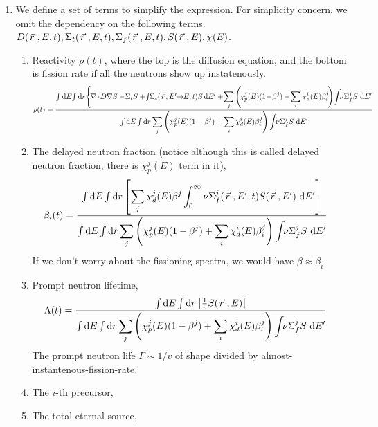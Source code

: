 \documentclass{school-22.211-notes}
\begin{document}
\begin{enumerate}
\item We define a set of terms to simplify the expression. For simplicity concern, we omit the dependency on the following terms. $D(\left.\vec{r}\right., E, t), \Sigma_t (\left.\vec{r}\right., E, t), \Sigma_f(\left.\vec{r}\right., E, t),  S(\left.\vec{r}\right., E), \chi(E)$. 
\begin{enumerate}
\item Reactivity $\rho(t)$, where the top is the diffusion equation, and the bottom is fission rate if all the neutrons show up instatenously. 
\scriptsize
\begin{align}
\rho (t) &= \frac{\int \bsp \dE \! \int \bsp \dr \Bigg\{ \!\divergence \! D  \gradient S  - \! \Sigma_t S  + \! \int \bsp \Sigma_s (\vecr \!, E' \bsp \to \bsp E, t) S \! \dE'   
    + \! \Sum_j \left( \! \chi_p^j (E) (1 \! - \! \beta^j) +  \! \Sum_i \chi_d^i (E) \beta_i^j \! \right) \! \int \bsp \nu \Sigma_f^j  S \dE'  }{\int \bsp \dE \int \bsp \dr \Sum_j \left( \chi_p^j (E) (1-\beta^j) + \Sum_i \chi_d^i (E) \beta_i^j \right) \int \bsp \nu \Sigma_f^j S \dE'} 
\end{align}
\normalsize
{}


\item The delayed neutron fraction (notice although this is called delayed neutron fraction, there is $\chi_p^j(E)$ term in it), 
\begin{align}
\beta_i (t) &= \frac{\int \bsp \dE \int \bsp \dr \left[ \Sum_j \chi_d^j (E) \beta^j \int_0^{\infty} \nu \Sigma_f^j (\vecr, E', t) S(\vecr, E') \dE' \right] }{\int \bsp \dE \int \bsp \dr \Sum_j \left( \chi_p^j (E) (1-\beta^j) + \Sum_i \chi_d^i (E) \beta_i^j \right) \int \bsp \nu \Sigma_f^j S \dE'} 
\end{align}
If we don't worry about the fissioning spectra, we would have $\beta \approx \beta_i$. 


\item Prompt neutron lifetime, 
\begin{align}
\Lambda (t) &= \frac{\int \bsp \dE \int \bsp  \dr \left[ \frac{1}{v} S(\vecr, E) \right] }{\int \bsp \dE \int \bsp \dr \Sum_j \left( \chi_p^j (E) (1-\beta^j) + \Sum_i \chi_d^i (E) \beta_i^j \right) \int \bsp \nu \Sigma_f^j S \dE'} 
\end{align}
The prompt neutron life $\Gamma \sim 1/v$ of shape divided by almost-instantenous-fission-rate. 
\item The $i$-th precursor, 
\item The total eternal source, 
\end{enumerate}


\end{enumerate}
\end{document}
